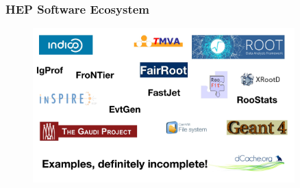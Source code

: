 \begin{frame}
\frametitle{HEP Software Ecosystem}

\begin{figure}[htbp]
\begin{center}
\includegraphics[width=0.9\textwidth]{images/hep-software-ecosystem.jpg}
\end{center}
\end{figure}

\end{frame}


